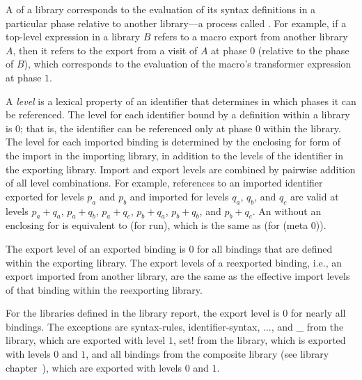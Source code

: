 A  of a library corresponds to the evaluation of its syntax
definitions in a particular phase relative to another
library---a process called .
For example, if a top-level expression in a library $B$ refers to
a macro export from another library $A$, then it refers to the export from a
visit of $A$ at phase $0$ (relative to the phase of $B$), which corresponds
to the evaluation of the macro's transformer expression at phase $1$.


%
A \emph{level} is a lexical property of an identifier that determines
in which phases it can be referenced. The level for each identifier
bound by a definition within a library is $0$; that is, the identifier
can be referenced only at phase $0$ within the library.
The level for each imported binding is determined by the enclosing {\cf
  for} form of the {\cf import} in the importing library, in
addition to the levels of the identifier in the exporting
library. Import and export levels are combined by pairwise addition of
all level combinations.  For example, references to an imported
identifier exported for levels $p_a$ and $p_b$ and imported for levels
$q_a$, $q_b$, and $q_c$ are valid at levels $p_a+q_a$, $p_a+q_b$,
$p_a+q_c$, $p_b+q_a$, $p_b+q_b$, and $p_b+q_c$. An 
without an enclosing {\cf for} is equivalent to {\cf (for
   run)}, which is the same as {\cf (for
   (meta 0))}.

The export level of an exported binding is $0$ for all bindings
that are defined within the exporting library. The export levels of a
reexported binding, i.e., an export imported from another library, are the
same as the effective import levels of that binding within the reexporting
library.

For the libraries defined in the library report, the export level is
$0$ for nearly all bindings. The exceptions are {\cf syntax-rules},
{\cf identifier-syntax}, {\cf ...}, and {\cf \_} from the
 library, which are exported with level $1$, {\cf
  set!} from the  library, which is exported with
levels $0$ and $1$, and all bindings from the composite
\thersixlibrary{} library (see library
chapter~), which are
exported with levels $0$ and $1$.

